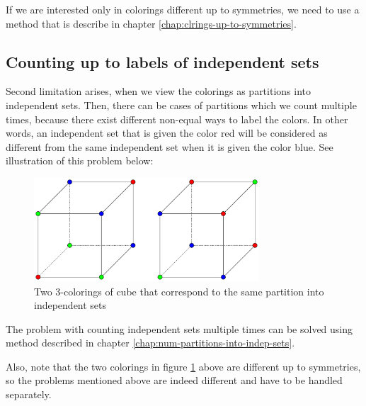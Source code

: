 \begin{highlight}
If we are interested only in colorings different up to symmetries, we need to use a method that is describe in chapter \ref{chap:clrings-up-to-symmetries}.

\subsection{Counting up to labels of independent sets}

Second limitation arises, when we view the colorings as partitions into independent sets. Then, there can be cases of partitions which we count multiple times, because there exist different non-equal ways to label the colors. In other words, an independent set that is given the color red will be considered as different from the same independent set when it is given the color blue. See illustration of this problem below:

\begin{figure}[H]
    \centering
    \includegraphics[width=0.75\textwidth]{Resources/Figs/cube_relabelings_problem.pdf}
    \caption{Two 3-colorings of cube that correspond to the same partition into independent sets}
    \label{fig:cube-clrings-same-partition}
\end{figure}

The problem with counting independent sets multiple times can be solved using method described in chapter \ref{chap:num-partitions-into-indep-sets}. 

Also, note that the two colorings in figure \ref{fig:cube-clrings-same-partition} above are different up to symmetries, so the problems mentioned above are indeed different and have to be handled separately.

\end{highlight}